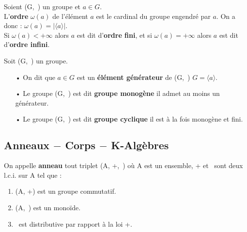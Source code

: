 \vspace{1cm}

Soient (G,\ \lci) un groupe et \(a\in G\).\\
L'\textbf{ordre} \(\omega(a)\) de l'élément \(a\) est le cardinal du groupe engendré par \(a\). On a donc : \(\omega(a)=| \langle a  \rangle|\).\vspace{0.1cm}\\
Si \(\omega(a)<+\infty\) alors \(a\) est dit d'\textbf{ordre fini}, et si \(\omega(a)=+\infty\) alors \(a\) est dit d'\textbf{ordre infini}.

\vspace{1.3cm}

Soit (G,\ \lci) un groupe.
\begin{itemize}[leftmargin=2cm]
    \item[•] On dit que \(a\in G\) est un \textbf{élément générateur} de (G,\ \lci) \ssi \(G=\bigl \langle a \bigr \rangle\).\vspace{0.1cm}
    
    \item[•] Le groupe (G,\ \lci) est dit \textbf{groupe monogène} \ssi il admet au moins un générateur.\vspace{0.1cm}
    
    \item[•] Le groupe (G,\ \lci) est dit \textbf{groupe cyclique} \ssi il est à la fois monogène et fini.
\end{itemize}


\vspace{1cm}

\subsection{Anneaux $-$ Corps $-$ K-Algèbres}

\vspace{1cm}

On appelle \textbf{anneau} tout triplet (A, +,\ \x) où A est un ensemble, + et \x \ sont deux l.c.i. sur A tel que :\vspace{-0.3cm}
\begin{enumerate}[leftmargin=2cm]
    \item (A, +) est un groupe commutatif.\vspace{0.1cm}
    
    \item (A,\ \x) est un monoïde.\vspace{0.1cm}
    
    \item \x \ est distributive par rapport à la loi +.\vspace{0.1cm}
\end{enumerate}

